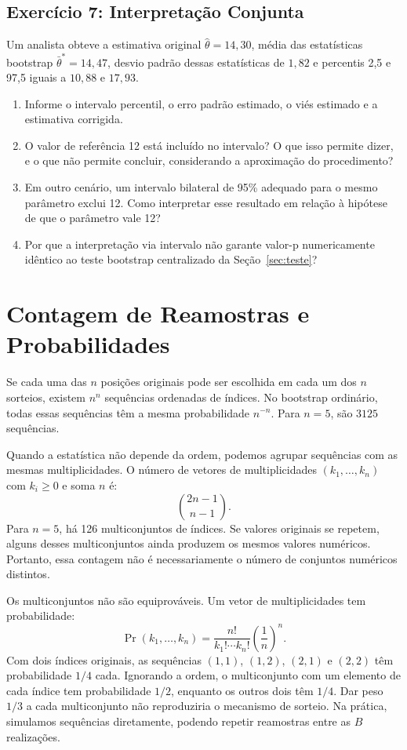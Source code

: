 \documentclass[12pt,a4paper]{article}
\begin{document}
\subsection*{Exercício 7: Interpretação Conjunta}
Um analista obteve a estimativa original $\hat\theta=14{,}30$, média das estatísticas bootstrap $\bar\theta^*=14{,}47$, desvio padrão dessas estatísticas de $1{,}82$ e percentis 2,5 e 97,5 iguais a $10{,}88$ e $17{,}93$.
\begin{enumerate}[label=(\alph*)]
\item Informe o intervalo percentil, o erro padrão estimado, o viés estimado e a estimativa corrigida.
\item O valor de referência 12 está incluído no intervalo? O que isso permite dizer, e o que não permite concluir, considerando a aproximação do procedimento?
\item Em outro cenário, um intervalo bilateral de 95\% adequado para o mesmo parâmetro exclui 12. Como interpretar esse resultado em relação à hipótese de que o parâmetro vale 12?
\item Por que a interpretação via intervalo não garante valor-p numericamente idêntico ao teste bootstrap centralizado da Seção~\ref{sec:teste}?
\end{enumerate}

\appendix
\section{Contagem de Reamostras e Probabilidades}
\label{ap:contagem}
Se cada uma das $n$ posições originais pode ser escolhida em cada um dos $n$ sorteios, existem $n^n$ sequências ordenadas de índices. No bootstrap ordinário, todas essas sequências têm a mesma probabilidade $n^{-n}$. Para $n=5$, são $3125$ sequências.

Quando a estatística não depende da ordem, podemos agrupar sequências com as mesmas multiplicidades. O número de vetores de multiplicidades $(k_1,\ldots,k_n)$ com $k_i\geq0$ e soma $n$ é:
\[
\binom{2n-1}{n-1}.
\]
Para $n=5$, há 126 multiconjuntos de índices. Se valores originais se repetem, alguns desses multiconjuntos ainda produzem os mesmos valores numéricos. Portanto, essa contagem não é necessariamente o número de conjuntos numéricos distintos.

Os multiconjuntos não são equiprováveis. Um vetor de multiplicidades tem probabilidade:
\[
\Pr(k_1,\ldots,k_n)=\frac{n!}{k_1!\cdots k_n!}\left(\frac1n\right)^n.
\]
Com dois índices originais, as sequências $(1,1)$, $(1,2)$, $(2,1)$ e $(2,2)$ têm probabilidade $1/4$ cada. Ignorando a ordem, o multiconjunto com um elemento de cada índice tem probabilidade $1/2$, enquanto os outros dois têm $1/4$. Dar peso $1/3$ a cada multiconjunto não reproduziria o mecanismo de sorteio. Na prática, simulamos sequências diretamente, podendo repetir reamostras entre as $B$ realizações.
\end{document}
